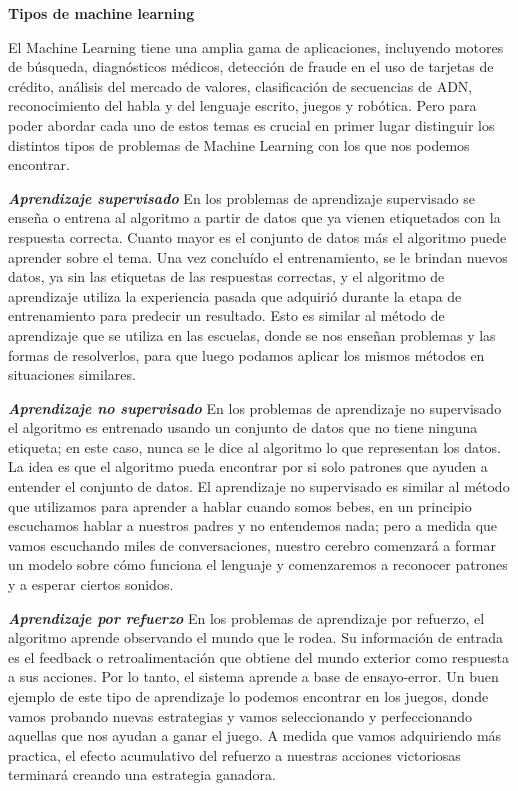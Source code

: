 \textbf{Tipos de machine learning}

El Machine Learning tiene una amplia gama de aplicaciones, incluyendo motores de búsqueda, diagnósticos médicos, detección de fraude en el uso de tarjetas de crédito, análisis del mercado de valores, clasificación de secuencias de ADN, reconocimiento del habla y del lenguaje escrito, juegos y robótica. Pero para poder abordar cada uno de estos temas es crucial en primer lugar distinguir los distintos tipos de problemas de Machine Learning con los que nos podemos encontrar.

\textbf{\textit{Aprendizaje supervisado}} En los problemas de aprendizaje supervisado se enseña o entrena al algoritmo a partir de datos que ya vienen etiquetados con la respuesta correcta. Cuanto mayor es el conjunto de datos más el algoritmo puede aprender sobre el tema. Una vez concluído el entrenamiento, se le brindan nuevos datos, ya sin las etiquetas de las respuestas correctas, y el algoritmo de aprendizaje utiliza la experiencia pasada que adquirió durante la etapa de entrenamiento para predecir un resultado. Esto es similar al método de aprendizaje que se utiliza en las escuelas, donde se nos enseñan problemas y las formas de resolverlos, para que luego podamos aplicar los mismos métodos en situaciones similares.

\textbf{\textit{Aprendizaje no supervisado}} En los problemas de aprendizaje no supervisado el algoritmo es entrenado usando un conjunto de datos que no tiene ninguna etiqueta; en este caso, nunca se le dice al algoritmo lo que representan los datos. La idea es que el algoritmo pueda encontrar por si solo patrones que ayuden a entender el conjunto de datos. El aprendizaje no supervisado es similar al método que utilizamos para aprender a hablar cuando somos bebes, en un principio escuchamos hablar a nuestros padres y no entendemos nada; pero a medida que vamos escuchando miles de conversaciones, nuestro cerebro comenzará a formar un modelo sobre cómo funciona el lenguaje y comenzaremos a reconocer patrones y a esperar ciertos sonidos.


\textbf{\textit{Aprendizaje por refuerzo}} En los problemas de aprendizaje por refuerzo, el algoritmo aprende observando el mundo que le rodea. Su información de entrada es el feedback o retroalimentación que obtiene del mundo exterior como respuesta a sus acciones. Por lo tanto, el sistema aprende a base de ensayo-error. Un buen ejemplo de este tipo de aprendizaje lo podemos encontrar en los juegos, donde vamos probando nuevas estrategias y vamos seleccionando y perfeccionando aquellas que nos ayudan a ganar el juego. A medida que vamos adquiriendo más practica, el efecto acumulativo del refuerzo a nuestras acciones victoriosas terminará creando una estrategia ganadora.


